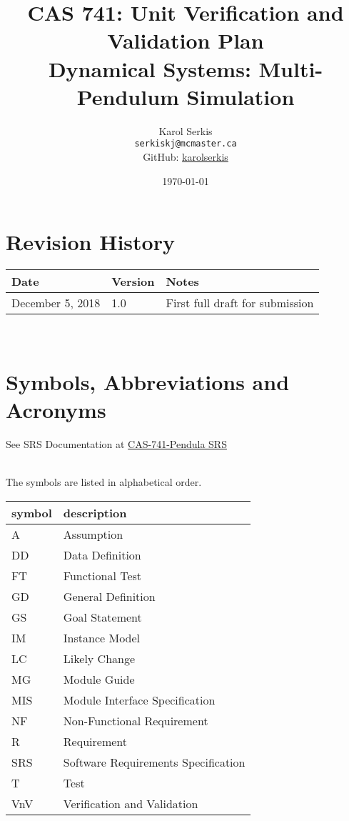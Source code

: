 \documentclass[12pt, titlepage]{article}
\newcommand{\progname}{Multi-Pendulum Simulation }
\begin{document}
\title{CAS 741: Unit Verification and Validation Plan\\[10pt]\Large Dynamical Systems: \progname}
\author{Karol Serkis\\\texttt{serkiskj@mcmaster.ca}\\GitHub:
\href{https://www.github.com/karolserkis}{karolserkis}}
\date{\today}
	
\maketitle


\section{Revision History}

\begin{tabularx}{\textwidth}{p{4cm}p{2cm}X}
\toprule {\bf Date} & {\bf Version} & {\bf Notes}\\
\midrule
December 5, 2018 & 1.0 &  First full draft for submission\\
\bottomrule
\end{tabularx}

~\newpage

\section{Symbols, Abbreviations and Acronyms}

See SRS Documentation at 
\href{https://github.com/karolserkis/CAS-741-Pendula/blob/master/docs/SRS/SRS.pdf}{CAS-741-Pendula SRS}

\\
The symbols are listed in alphabetical order.\\

\renewcommand{\arraystretch}{1.2}
\begin{tabular}{l l} 
  \toprule		
  \textbf{symbol} & \textbf{description}\\
  \midrule 
  A & Assumption\\
  DD & Data Definition\\
  FT & Functional Test \\
  GD & General Definition\\
  GS & Goal Statement\\
  IM & Instance Model\\
  LC & Likely Change\\
  MG & Module Guide\\ 
  MIS & Module Interface Specification\\ 
  NF & Non-Functional Requirement\\
  R & Requirement\\
  SRS & Software Requirements Specification\\
  T & Test\\
  VnV & Verification and Validation\\ 
  \bottomrule
\end{tabular}\\
\end{document}
